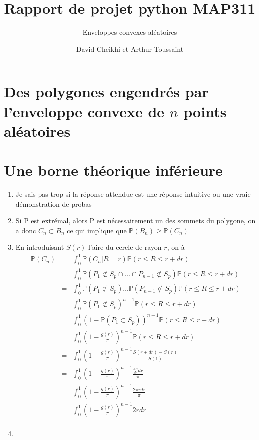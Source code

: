 \documentclass[a4paper,12pt,twoside]{article}
\title{Rapport de projet python MAP311}
\subtitle{Enveloppes convexes aléatoires}
\author{David Cheikhi et Arthur Toussaint}
\newcommand{\p}{\mathbb{P}}
\begin{document}
\maketitle

\section{Des polygones engendrés par l'enveloppe convexe de $n$ points aléatoires}
\section{Une borne théorique inférieure}
	\begin{enumerate}
		\item Je sais pas trop si la réponse attendue est une réponse intuitive ou une vraie démonstration de probas
		\item \label{extr} Si P est extrémal, alors P est nécessairement un des sommets du polygone, on a donc $C_n \subset B_n$ ce qui implique que $\p(B_n) \geq \p(C_n)$
		\item En introduisant $S(r)$ l'aire du cercle de rayon $r$, on à
		\begin{eqnarray}
			\p(C_n) &=& \int_0^1{\p(C_n | R = r) \p(r\leq R \leq r + dr)} \\
				&=& \int_0^1{\p(P_1 \not\subset S_p \cap \ldots \cap P_{n-1} \not\subset S_p)\p(r\leq R \leq r + dr)} \\
				&=& \int_0^1{\p(P_1 \not\subset S_p) \ldots \p(P_{n-1} \not\subset S_p)\p(r\leq R \leq r + dr)} \\
				&=& \int_0^1{\p(P_1 \not\subset S_p)^{n-1}\p(r\leq R \leq r + dr)} \\
				&=& \int_0^1{(1 - \p(P_1 \subset S_p))^{n-1}\p(r\leq R \leq r + dr)} \\
				&=& \int_0^1{\left( 1 - \frac{g(r)}{\pi}\right) ^{n-1}\p(r\leq R \leq r + dr)} \\
				&=& \int_0^1{\left( 1 - \frac{g(r)}{\pi}\right) ^{n-1}\frac{S(r + dr) - S(r)}{S(1)}} \\
				&=& \int_0^1{\left( 1 - \frac{g(r)}{\pi}\right) ^{n-1}\frac{\frac{dS}{dr}dr}{\pi}} \\
				&=& \int_0^1{\left( 1 - \frac{g(r)}{\pi}\right) ^{n-1}\frac{2\pi r dr}{\pi}} \\
				&=& \int_0^1{\left( 1 - \frac{g(r)}{\pi}\right) ^{n-1}2 r dr} \\
		\end{eqnarray}
		\item
			\begin{figure}

\end{figure}
\end{enumerate}
\end{document}
